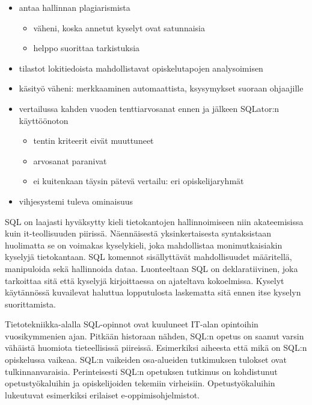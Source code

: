 \documentclass[finnish,twoside,openright]{HYgraduMLDS}
\begin{document}
\begin{itemize}
    \item antaa hallinnan plagiarismista
    \begin{itemize}
        \item väheni, koska annetut kyselyt ovat satunnaisia
        \item helppo suorittaa tarkistuksia
    \end{itemize}
    \item tilastot lokitiedoista mahdollistavat opiskelutapojen analysoimisen
    \item käsityö väheni: merkkaaminen automaattista, ksysymykset suoraan ohjaajille
    \item vertailussa kahden vuoden tenttiarvosanat ennen ja jälkeen SQLator:n käyttöönoton
    \begin{itemize}
        \item tentin kriteerit eivät muuttuneet
        \item arvosanat paranivat
        \item ei kuitenkaan täysin pätevä vertailu: eri opiskelijaryhmät
    \end{itemize}
    \item vihjesystemi tuleva ominaisuus
\end{itemize}

SQL on laajasti hyväksytty kieli tietokantojen hallinnoimiseen niin akateemisissa kuin it-teollisuuden piirissä. Näennäisestä yksinkertaisesta syntaksistaan huolimatta se on voimakas kyselykieli, joka mahdollistaa monimutkaisiakin kyselyjä tietokantaan. SQL komennot sisällyttävät mahdollisuudet määritellä, manipuloida sekä hallinnoida dataa. Luonteeltaan SQL on deklaratiivinen, joka tarkoittaa sitä että kyselyjä kirjoittaessa on ajateltava kokoelmissa. Kyselyt käytännössä kuvailevat haluttua lopputulosta laskematta sitä ennen itse kyselyn suorittamista.

Tietotekniikka-alalla SQL-opinnot ovat kuuluneet IT-alan opintoihin vuosikymmenien ajan. Pitkään historaan nähden, SQL:n opetus on saanut varsin vähäistä huomiota tieteellisissä piireissä\cite{Taipalus:2019:EFS:3287324.3287359}. Esimerkiksi aiheesta että mikä on SQL:n opiskelussa vaikeaa. SQL:n vaikeiden osa-alueiden tutkimuksen tulokset ovat tulkinnanvaraisia\cite{Taipalus:2019:EFS:3287324.3287359}. Perinteisesti SQL:n opetuksen tutkimus on kohdistunut opetustyökaluihin ja opiskelijoiden tekemiin virheisiin\cite{Taipalus:2019:EFS:3287324.3287359}. Opetustyökaluihin lukeutuvat esimerkiksi erilaiset e-oppimisohjelmistot. 
\end{document}
